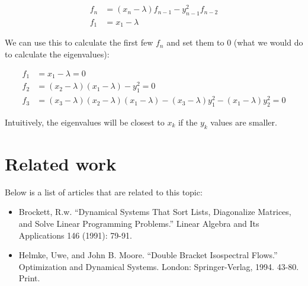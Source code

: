 \documentclass{article}
\begin{document}
\begin{align*}
f_n &= (x_n-\lambda)f_{n-1}-y_{n-1}^2f_{n-2} \\
f_1 &= x_1-\lambda
\end{align*}

We can use this to calculate the first few $f_n$ and set them to $0$ (what we would do to calculate the eigenvalues):

\begin{align*}
f_1 &= x_1-\lambda = 0\\
f_2 &= (x_2-\lambda)(x_1-\lambda)-y_1^2 = 0\\
f_3 &= (x_3-\lambda)(x_2-\lambda)(x_1-\lambda)-(x_3-\lambda)y_1^2-(x_1-\lambda)y^2_2 = 0
\end{align*}

Intuitively, the eigenvalues will be closest to $x_k$ if the $y_k$ values are smaller. 


\section{Related work}
Below is a list of articles that are related to this topic: 
\begin{itemize}

\item{
    Brockett, R.w. ``Dynamical Systems That Sort Lists, Diagonalize Matrices, and Solve Linear Programming Problems.'' Linear Algebra and Its Applications 146 (1991): 79-91. }
\item{
    Helmke, Uwe, and John B. Moore. ``Double Bracket Isospectral Flows.'' Optimization and Dynamical Systems. London: Springer-Verlag, 1994. 43-80. Print.}
\end{itemize}
\end{document}
